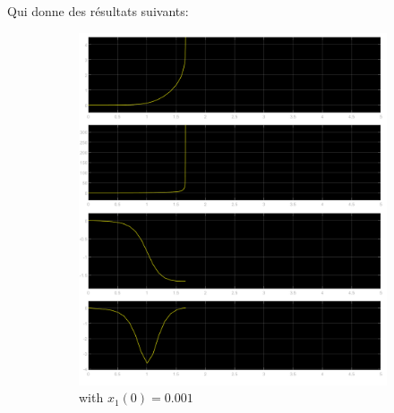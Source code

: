 \documentclass[class=article, crop=false]{standalone}
\begin{document}
\begin{resolution}
    Qui donne des résultats suivants:
    \begin{figure}[H]
        \centering
        \begin{subfigure}[b]{0.425\textwidth}
            \centering
            \includegraphics[width=\textwidth]{../images/simulink_scope20_0_001.png}
            \caption{with $x_1(0) = 0.001$}
        \end{subfigure}
        \begin{subfigure}[b]{0.425\textwidth}
            \centering

\end{subfigure}
\end{figure}
\end{resolution}
\end{document}
